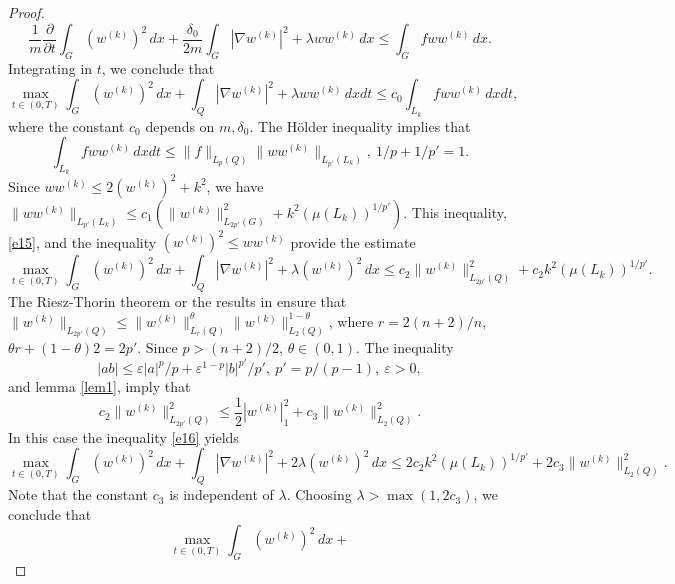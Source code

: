 \documentclass{article}
\theoremstyle{plain}
\begin{document}
\begin{proof}
\begin{equation}\label{e14}
\frac{1}{m}\frac{\partial}{\partial t} \int_{G} (w^{(k)})^2\,dx +
\frac{\delta_0}{2m}  \int_{G} |\nabla w^{(k)}|^2+ \lambda w w^{(k)}\,dx \leq  \int_G f w w^{(k)} \,dx. 
\end{equation}
Integrating in $t$, we conclude that 
\begin{equation}\label{e15}
\max_{t\in (0,T)} \int_{G} (w^{(k)})^2\,dx +
\int_{Q} |\nabla w^{(k)}|^2+ \lambda  w w^{(k)}\,dxdt \leq  c_0\int_{L_k} f w w^{(k)} \,dxdt, 
\end{equation}
where the constant  $c_0$ depends on  $m,\delta_0$. 
The H\"{o}lder inequality implies that 
$$
\int_{L_k} f w w^{(k)} \,dxdt \leq \|f\|_{L_{p}(Q)}\|ww^{(k)}\|_{L_{p'}(L_k)},\ 1/p+1/p'=1.
$$
Since $ww^{(k)}\leq 2 (w^{(k)})^2+k^2$, we have 
$\|ww^{(k)}\|_{L_{p'}(L_k)}\leq c_1( \|w^{(k)}\|_{L_{2p'}(G)}^2+ k^2(\mu(L_k))^{1/p'})$.
This inequality,    \eqref{e15}, and the inequality  $(w^{(k)})^2\leq  ww^{(k)}$ provide the estimate 
 \begin{equation}\label{e16}
\max_{t\in (0,T)} \int_{G} (w^{(k)})^2\,dx +
\int_{Q} |\nabla w^{(k)}|^2+ \lambda  (w^{(k)})^2\,dx \leq  c_2\|w^{(k)}\|_{L_{2p'}(Q)}^2+ c_2k^2 (\mu(L_k))^{1/p'}. 
\end{equation}
The Riesz-Thorin theorem or the results in  \cite[Sect. 1.18.4]{tri} ensure that 
$\|w^{(k)}\|_{L_{2p'}(Q)}\leq \|w^{(k)}\|_{L_{r}(Q)}^\theta \|w^{(k)}\|_{L_{2}(Q)}^{1-\theta}$,
where $r=2(n+2)/n$, $\theta r+(1-\theta)2=2p'$. Since   $p>(n+2)/2$,  $\theta\in (0,1)$.  
The inequality 
\begin{equation}\label{e64}
 |ab|\leq \varepsilon |a|^p/p+\varepsilon^{1-p} |b|^{p'}/p', \  p'=p/(p-1),\ \varepsilon>0, 
 \end{equation} 
 and lemma  \ref{lem1},  imply that 
\begin{equation*}
c_2\|w^{(k)}\|_{L_{2p'}(Q)}^2\leq  \frac{1}{2}|w^{(k)}|_{1}^2+ c_3\|w^{(k)}\|_{L_{2}(Q)}^2.
\end{equation*} 
In this case the inequality  \eqref{e16} yields 
 \begin{equation}\label{e17}
\max_{t\in (0,T)} \int_{G} (w^{(k)})^2\,dx +
\int_{Q} |\nabla w^{(k)}|^2+ 2\lambda  (w^{(k)})^2\,dx \leq  2c_2k^2(\mu(L_k))^{1/p'}+ 2c_3\|w^{(k)}\|_{L_{2}(Q)}^2. 
\end{equation}
Note that the constant $c_3$ is independent of $\lambda$.
Choosing  $\lambda >\max(1,2c_3)$, we conclude that 
 \begin{equation}\label{e18}
\max_{t\in (0,T)} \int_{G} (w^{(k)})^2\,dx +

\end{equation}
\end{proof}
\end{document}
